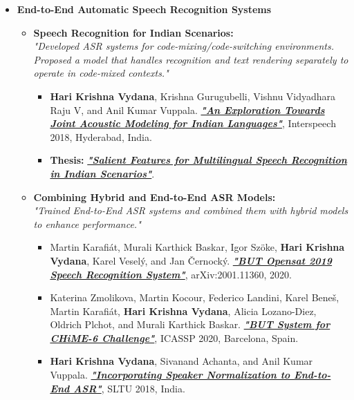 \documentclass[11pt,a4paper,sans]{moderncv} %
\begin{document}
\begin{itemize}[labelwidth=2mm,labelindent=8pt,leftmargin=2cm,align=left]
\item[$\bullet$] \textbf{End-to-End Automatic Speech Recognition Systems}
\begin{itemize}[itemsep=2mm,labelwidth=0mm,labelindent=5pt,leftmargin=1cm,align=middle]
    \item{\textbf{Speech Recognition for Indian Scenarios:}\\
    \textit{\scriptsize "Developed ASR systems for code-mixing/code-switching environments. Proposed a model that handles recognition and text rendering separately to operate in code-mixed contexts."}}
    \begin{itemize}[itemsep=2mm]
        \scriptsize
        \item[\tiny$\bullet$]{\textbf{Hari Krishna Vydana}, Krishna Gurugubelli, Vishnu Vidyadhara Raju V, and Anil Kumar Vuppala. \href{https://www.isca-speech.org/archive/pdfs/interspeech_2018/vydana18_interspeech.pdf}{\textbf{\textit{"An Exploration Towards Joint Acoustic Modeling for Indian Languages"}}}, Interspeech 2018, Hyderabad, India.}
        \item[\tiny$\bullet$]{\textbf{Thesis:} \href{http://14.139.116.20:8080/jspui/handle/10603/246056}{\textbf{\textit{"Salient Features for Multilingual Speech Recognition in Indian Scenarios"}}}.}
    \end{itemize}
    \item{\textbf{Combining Hybrid and End-to-End ASR Models:}\\
    \textit{\scriptsize "Trained End-to-End ASR systems and combined them with hybrid models to enhance performance."}}
    \begin{itemize}[itemsep=2mm]
        \scriptsize
        \item[\tiny$\bullet$]{Martin Karafiát, Murali Karthick Baskar, Igor Szöke, \textbf{Hari Krishna Vydana}, Karel Veselý, and Jan Černocký. \href{https://arxiv.org/abs/2001.11360}{\textbf{\textit{"BUT Opensat 2019 Speech Recognition System"}}}, arXiv:2001.11360, 2020.}
        \item[\tiny$\bullet$]{Katerina Zmolikova, Martin Kocour, Federico Landini, Karel Beneš, Martin Karafiát, \textbf{Hari Krishna Vydana}, Alicia Lozano-Diez, Oldrich Plchot, and Murali Karthick Baskar. \href{https://www.isca-speech.org/archive/pdfs/chime_2020/zmolikova20_chime.pdf}{\textbf{\textit{"BUT System for CHiME-6 Challenge"}}}, ICASSP 2020, Barcelona, Spain.}
        \item[\tiny$\bullet$]{\textbf{Hari Krishna Vydana}, Sivanand Achanta, and Anil Kumar Vuppala. \href{https://www.isca-speech.org/archive/pdfs/sltu_2018/krishna18_sltu.pdf}{\textbf{\textit{"Incorporating Speaker Normalization to End-to-End ASR"}}}, SLTU 2018, India.}

\end{itemize}
\end{itemize}
\end{itemize}
\end{document}
